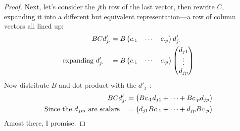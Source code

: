 \documentclass[a4paper,12pt]{scrartcl}
\begin{document}
\begin{proof}
Next, let's consider the $j$th row of the last vector, then
rewrite $C$, expanding it into a different but equivalent
representation---a row of column vectors all lined up:
\begin{align*}
    BCd'_{j\cdot} &= B 
	\begin{pmatrix} c_{\cdot 1} & \cdots & c_{\cdot p}
	\end{pmatrix} d'_{j \cdot} \notag \\
    \text{expanding $d'_{j \cdot}$} \quad 
	&= B 
	\begin{pmatrix} c_{\cdot 1} & \cdots & c_{\cdot p}
	\end{pmatrix}  
	\begin{pmatrix} d_{j 1} \\ \vdots \\ d_{j p}
	\end{pmatrix}  
\end{align*}
Now distribute $B$ and dot product with the $d'_{j\cdot}$:
\begin{align}
    BCd'_{j\cdot} &= 
	\begin{pmatrix} Bc_{\cdot 1} d_{j 1} + \cdots 
	    + Bc_{\cdot p} d_{j p}
	\end{pmatrix}   \notag \\
    \text{Since the $d_{jm}$ are scalars} \quad &= 
	\begin{pmatrix}  d_{j 1} Bc_{\cdot 1} + \cdots 
	    +  d_{j p}Bc_{\cdot p}
	\end{pmatrix}   \notag 
\end{align}
Amost there, I promise.


\end{proof}
\end{document}
